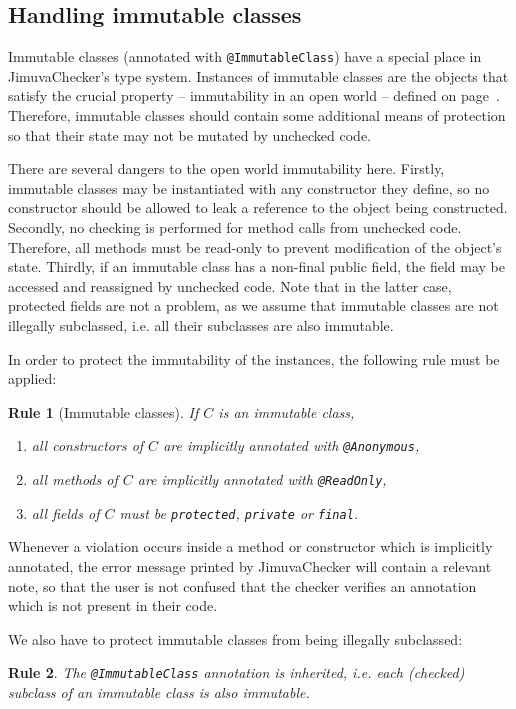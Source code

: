 \documentclass{pracamgr}
\theoremstyle{break}
\theoremstyle{break}
\theoremstyle{break}
\newtheorem{verrule}{Rule}
\begin{document}
\subsection{Handling immutable classes}

Immutable classes (annotated with \texttt{@ImmutableClass}) have a
special place in JimuvaChecker's type system. Instances of immutable
classes are the objects that satisfy the crucial property --
immutability in an open world -- defined on
page~\pageref{inv:open}. Therefore, immutable classes should contain
some additional means of protection so that their state may not be
mutated by unchecked code.

There are several dangers to the open world immutability
here. Firstly, immutable classes may be instantiated with any
constructor they define, so no constructor should be allowed to leak a
reference to the object being constructed. Secondly, no checking is
performed for method calls from unchecked code. Therefore, all methods
must be read-only to prevent modification of the object's
state. Thirdly, if an immutable class has a non-final public field,
the field may be accessed and reassigned by unchecked code. Note that
in the latter case, protected fields are not a problem, as we assume
that immutable classes are not illegally subclassed, i.e. all their
subclasses are also immutable.

In order to protect the immutability of the instances, the following
rule must be applied:
\begin{verrule}[Immutable classes]
  If $C$ is an immutable class, 
  \begin{enumerate}[label=(\arabic*)]
  \item all constructors of $C$ are implicitly annotated with \texttt{@Anonymous},
  \item all methods of $C$ are implicitly annotated with \texttt{@ReadOnly},  
  \item all fields of $C$ must be \texttt{protected}, \texttt{private} or \texttt{final}.
  \end{enumerate}
\end{verrule}

Whenever a violation occurs inside a method or constructor which is
implicitly annotated, the error message printed by JimuvaChecker will
contain a relevant note, so that the user is not confused that the
checker verifies an annotation which is not present in their code.

We also have to protect immutable classes from being illegally
subclassed: 
\begin{verrule}
  The \texttt{@ImmutableClass} annotation is inherited, i.e. each
  (checked) subclass of an immutable class is also immutable. 
\end{verrule}
\end{document}
